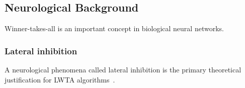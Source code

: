     \subsection{Neurological Background}
    Winner-takes-all is an important concept in biological neural networks. 
     \Anna

    \subsubsection{Lateral inhibition}
    A neurological phenomena called lateral inhibition is the primary theoretical justification for LWTA algorithms~\citep{Chen}. 

    
        

